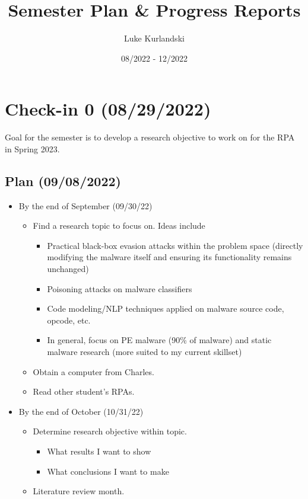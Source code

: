 \documentclass{article}
\title{Semester Plan \& Progress Reports}
\author{Luke Kurlandski}
\date{08/2022 - 12/2022}
\begin{document}
\maketitle

\section*{Check-in 0 (08/29/2022)}

Goal for the semester is to develop a research objective to work on for the RPA in Spring 2023.

\subsection*{Plan (09/08/2022)}

\begin{itemize}
	\item By the end of September (09/30/22)
	\begin{itemize}
		\item Find a research topic to focus on. Ideas include
		\begin{itemize}
			\item Practical black-box evasion attacks within the problem space (directly modifying the malware itself and ensuring its functionality remains unchanged)
			\item Poisoning attacks on malware classifiers
			\item Code modeling/NLP techniques applied on malware source code, opcode, etc.
			\item In general, focus on PE malware (90\% of malware) and static malware research (more suited to my current skillset)
		\end{itemize}
		\item Obtain a computer from Charles.
		\item Read other student's RPAs.
	\end{itemize}
	\item By the end of October (10/31/22)
	\begin{itemize}
		\item Determine research objective within topic.
		\begin{itemize}
			\item What results I want to show
			\item What conclusions I want to make
		\end{itemize}
		\item Literature review month.
	\end{itemize}

\end{itemize}
\end{document}
